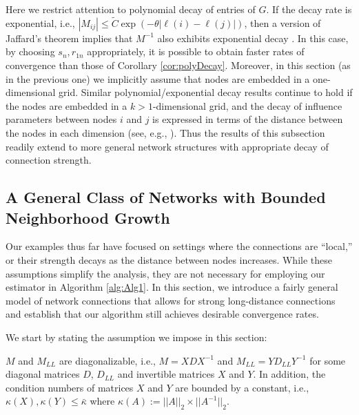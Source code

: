 \documentclass[opre,nonblindrev]{informs3} %
\begin{document}
\begin{remark} Here we restrict attention to polynomial decay of entries of $G$.
	If the decay rate is exponential, i.e.,
	$ |M_{ij}|\leq \tilde C \exp(-\theta|\ell(i)-\ell(j)|)$, then a version of Jaffard's theorem implies that $M^{-1}$ also exhibits exponential decay  \citep{benedetto2006}. In this case,
	by choosing $s_n, r_{1n} $  appropriately,
	it is possible to  obtain faster rates of convergence than those of Corollary \ref{cor:polyDecay}.
	Moreover, in this section (as in the previous one) we implicitly assume that nodes are embedded in a one-dimensional grid.
	Similar polynomial/exponential decay results continue to hold if the nodes are embedded in a $k>1$-dimensional grid,
	and the decay of influence parameters between nodes $i$ and $j$ is expressed in terms of
	the distance between the nodes
	 in each dimension
	(see, e.g., \citet{grochenig2010noncommutative}).
	Thus the results of this subsection readily extend to more general network structures with appropriate decay of connection strength. \hfill \halmos
\end{remark}

\subsection{A General Class of Networks with Bounded Neighborhood Growth}
Our examples thus far have focused on settings where the connections are ``local,'' or their strength decays as
the distance between nodes increases.
While these assumptions simplify the analysis, they are not necessary for employing our estimator in Algorithm \ref{alg:Alg1}. In this section, we introduce a fairly general model of network connections that allows for strong long-distance connections and establish that our algorithm still achieves desirable convergence rates.


We start by stating the assumption we impose  in this section:
\begin{assumption} \label{ass:diagonalizable}
	$M$
	and $M_{LL}$ are
	diagonalizable, i.e., $M= X D X^{-1}$ and
	$M_{LL}= Y D_{LL} Y^{-1}$
	for some diagonal matrices $D$,  $D_{LL}$ and invertible matrices $X$ and $Y$.
	In addition,
	the condition numbers of matrices $X$ and $Y$ are bounded by a constant, i.e.,
	$\kappa(X), \kappa(Y) \leq \bar{\kappa}$
	where $\kappa(A) := ||A||_2 \times ||A^{-1}||_2$.	
\end{assumption}
\end{document}
